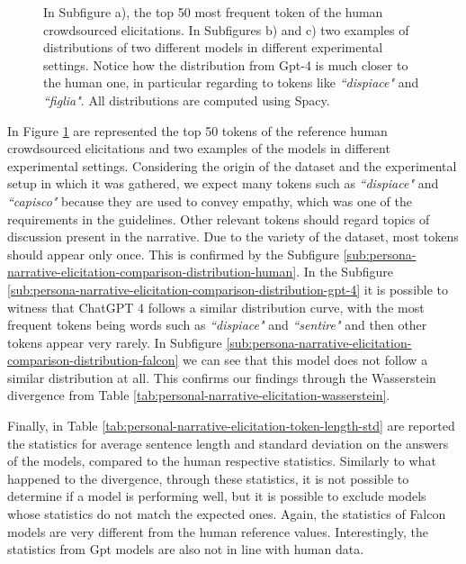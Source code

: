 \begin{figure}[!htbp]
    \caption{In Subfigure a), the top 50 most frequent token of the human crowdsourced elicitations. In Subfigures b) and c) two examples of distributions of two different models in different experimental settings. Notice how the distribution from Gpt-4 is much closer to the human one, in particular regarding to tokens like \emph{``dispiace"} and \emph{``figlia"}. All distributions are computed using Spacy.}
    \label{fig:persona-narrative-elicitation-comparison-distribution}
\end{figure}

In Figure \ref{fig:persona-narrative-elicitation-comparison-distribution} are represented the top 50 tokens of the reference human crowdsourced elicitations and two examples of the models in different experimental settings. Considering the origin of the dataset and the experimental setup in which it was gathered, we expect many tokens such as \emph{``dispiace"} and \emph{``capisco"} because they are used to convey empathy, which was one of the requirements in the guidelines. Other relevant tokens should regard topics of discussion present in the narrative. Due to the variety of the dataset, most tokens should appear only once. This is confirmed by the Subfigure \ref{sub:persona-narrative-elicitation-comparison-distribution-human}. 
In the Subfigure \ref{sub:persona-narrative-elicitation-comparison-distribution-gpt-4} it is possible to witness that ChatGPT 4 follows a similar distribution curve, with the most frequent tokens being words such as \emph{``dispiace"} and \emph{``sentire"} and then other tokens appear very rarely. 
In Subfigure \ref{sub:persona-narrative-elicitation-comparison-distribution-falcon} we can see that this model does not follow a similar distribution at all. This confirms our findings through the Wasserstein divergence from Table \ref{tab:personal-narrative-elicitation-wasserstein}.

% 
Finally, in Table \ref{tab:personal-narrative-elicitation-token-length-std} are reported the statistics for average sentence length and standard deviation on the answers of the models, compared to the human respective statistics. Similarly to what happened to the divergence, through these statistics, it is not possible to determine if a model is performing well, but it is possible to exclude models whose statistics do not match the expected ones. Again, the statistics of Falcon models are very different from the human reference values. Interestingly, the statistics from Gpt models are also not in line with human data. 

